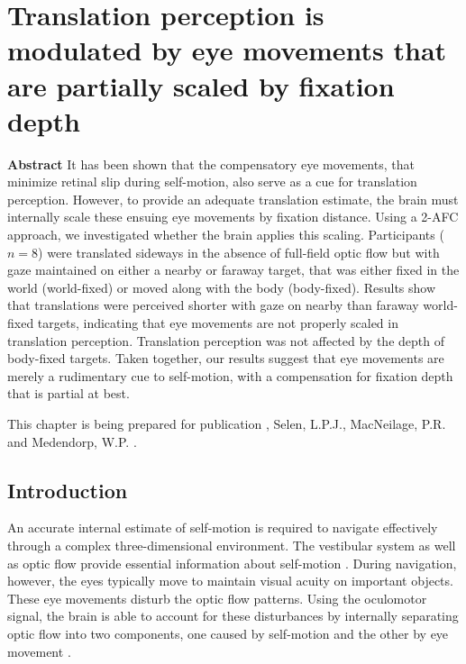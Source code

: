 \thispagestyle{empty}

\chapter{Translation perception is modulated by eye movements that are partially scaled by fixation depth}
\chaptermark{}

\label{p4}

\newpage

\small {\bf Abstract}
It has been shown that the compensatory eye movements, that minimize retinal slip during self-motion, also serve as a cue for translation perception. However, to provide an adequate translation estimate, the brain must internally scale these ensuing eye movements by fixation distance. Using a 2-AFC approach, we investigated whether the brain applies this scaling.  Participants ($n = 8$) were translated sideways in the absence of full-field optic flow but with gaze maintained on either a nearby or faraway target, that was either fixed in the world (world-fixed) or moved along with the body (body-fixed). Results show that translations were perceived shorter with gaze on nearby than faraway world-fixed targets, indicating that eye movements are not properly scaled in translation perception. Translation perception was not affected by the depth of body-fixed targets. Taken together, our results suggest that eye movements are merely a rudimentary cue to self-motion, with a compensation for fixation depth that is partial at best.

\vfill

\noindent\underline{ \hspace{4cm} }

\noindent This chapter is being prepared for publication \newline
{}, Selen, L.P.J., MacNeilage, P.R. and Medendorp, W.P. \citeyear{clemens2015b}. %

\newpage




\section{Introduction}

An accurate internal estimate of self-motion is required to navigate effectively through a complex three-dimensional environment. The vestibular system as well as optic flow provide essential information about self-motion \cite{gibson1955, benson1986, harris2000, israel1989, angelaki2005, carriot2013, chen2010}. During navigation, however, the eyes typically move to maintain visual acuity on important objects. These eye movements disturb the optic flow patterns. Using the oculomotor signal, the brain is able to account for these disturbances by internally separating optic flow into two components, one caused by self-motion and the other by eye movement \cite{warren1988, royden1992, freeman1998, lappe1999}.

